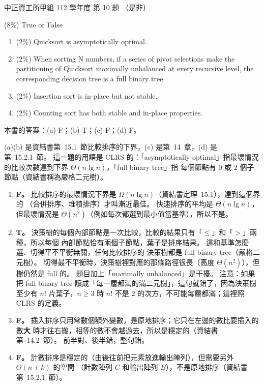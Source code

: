 \begin{pastexam}[label={px:ccu-112-swa-03}]{中正資工所甲組 112 學年度 第 10 題}
（是非）

(8\%) True or False
\begin{enumerate}[label=(\alph*)]
\item (2\%) Quicksort is asymptotically optimal.
\item (2\%) When sorting N numbers, if a series of pivot selections make the partitioning of
Quicksort maximally unbalanced at every recursive level, the corresponding decision tree is a full
binary tree.
\item (2\%) Insertion sort is in-place but not stable.
\item (2\%) Counting sort has both stable and in-place properties.
\end{enumerate}
\end{pastexam}

\begin{pastsoln}
本書的答案：(a) F；(b) T；(c) F；(d) F。

(a)(b) 是資結書第~15.1~節比較排序的下界，(c) 是第~14~章，(d) 是第~15.2.1~節。 這一題的用語是 CLRS
的：「asymptotically optimal」指最壞情況的比較次數達到下界 $\Theta(n \lg n)$，「full binary tree」指
每個節點有 $0$ 或 $2$ 個子節點（資結書稱為嚴格二元樹）。
\begin{enumerate}[label=(\alph*)]
\item \textbf{F。} 比較排序的最壞情況下界是 $\Omega(n \lg n)$（資結書定理~15.1），達到這個界的
（合併排序、堆積排序）才叫漸近最佳。 快速排序的平均是 $\Theta(n \lg n)$，但最壞情況是
$\Theta(n^2)$（例如每次都選到最小值當基準），所以不是。
\item \textbf{T。} 決策樹的每個內部節點是一次比較，比較的結果只有「$\le$」和「$>$」兩種，所以每個
內部節點恰有兩個子節點，葉子是排序結果。 這和基準怎麼選、切得平不平衡無關，任何比較排序的
決策樹都是 full binary tree（嚴格二元樹）。 切得最不平衡時，決策樹裡對應的那條路徑很長（高度
$\Theta(n^2)$），但樹仍然是 full 的。 題目加上「maximally unbalanced」是干擾。 注意：如果把
full binary tree 讀成「每一層都滿的滿二元樹」，這句就錯了，因為決策樹至少有 $n!$ 片葉子，$n \ge 3$
時 $n!$ 不是 $2$ 的次方，不可能每層都滿；這裡照 CLRS 的定義。
\item \textbf{F。} 插入排序只用常數個額外變數，是原地排序；它只在左邊的數比要插入的數\textbf{大}
時才往右搬，相等的數不會越過去，所以是穩定的（資結書第~14.2~節）。 前半對、後半錯，整句錯。
\item \textbf{F。} 計數排序是穩定的（由後往前把元素放進輸出陣列），但需要另外 $\Theta(n + k)$ 的空間
（計數陣列 $C$ 和輸出陣列 $B$），不是原地排序（資結書第~15.2.1~節）。
\end{enumerate}
\end{pastsoln}
